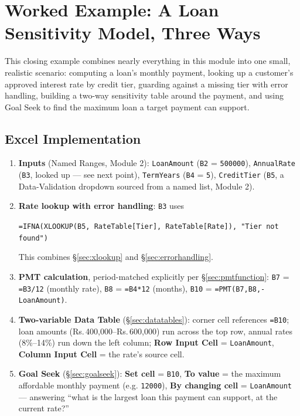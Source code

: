 \documentclass[11pt,a4paper]{article}
\begin{document}
\section{Worked Example: A Loan Sensitivity Model, Three Ways}

This closing example combines nearly everything in this module into one small, realistic scenario: computing a loan's monthly payment, looking up a customer's approved interest rate by credit tier, guarding against a missing tier with error handling, building a two-way sensitivity table around the payment, and using Goal Seek to find the maximum loan a target payment can support.

\subsection{Excel Implementation}

\begin{enumerate}
  \item \textbf{Inputs} (Named Ranges, Module 2): \texttt{LoanAmount} (\texttt{B2} = \texttt{500000}), \texttt{AnnualRate} (\texttt{B3}, looked up --- see next point), \texttt{TermYears} (\texttt{B4} = \texttt{5}), \texttt{CreditTier} (\texttt{B5}, a Data-Validation dropdown sourced from a named list, Module 2).
  \item \textbf{Rate lookup with error handling}: \texttt{B3} uses
  \par\smallskip
  \texttt{=IFNA(XLOOKUP(B5, RateTable[Tier], RateTable[Rate]), "Tier not found")}
  \par\smallskip
  This combines \S\ref{sec:xlookup} and \S\ref{sec:errorhandling}.
  \item \textbf{PMT calculation}, period-matched explicitly per \S\ref{sec:pmtfunction}: \texttt{B7} = \texttt{=B3/12} (monthly rate), \texttt{B8} = \texttt{=B4*12} (months), \texttt{B10} = \texttt{=PMT(B7,B8,-LoanAmount)}.
  \item \textbf{Two-variable Data Table} (\S\ref{sec:datatables}): corner cell references \texttt{=B10}; loan amounts (Rs.\,400,000--Rs.\,600,000) run across the top row, annual rates (8\%--14\%) run down the left column; \textbf{Row Input Cell} = \texttt{LoanAmount}, \textbf{Column Input Cell} = the rate's source cell.
  \item \textbf{Goal Seek} (\S\ref{sec:goalseek}): \textbf{Set cell} = \texttt{B10}, \textbf{To value} = the maximum affordable monthly payment (e.g. \texttt{12000}), \textbf{By changing cell} = \texttt{LoanAmount} --- answering ``what is the largest loan this payment can support, at the current rate?''
\end{enumerate}
\end{document}
